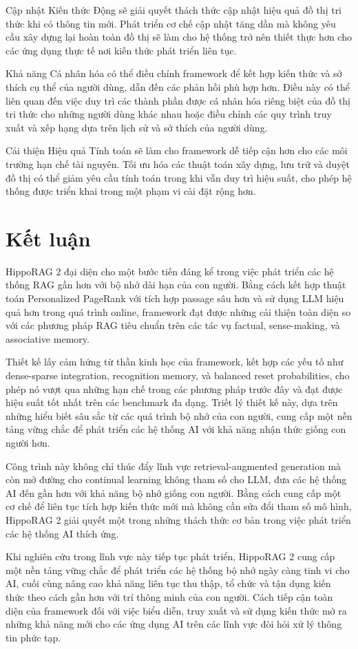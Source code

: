 \documentclass[../main.tex]{subfiles}
\begin{document}
Cập nhật Kiến thức Động sẽ giải quyết thách thức cập nhật hiệu quả đồ thị tri thức khi có thông tin mới. Phát triển cơ chế cập nhật tăng dần mà không yêu cầu xây dựng lại hoàn toàn đồ thị sẽ làm cho hệ thống trở nên thiết thực hơn cho các ứng dụng thực tế nơi kiến thức phát triển liên tục.

Khả năng Cá nhân hóa có thể điều chỉnh framework để kết hợp kiến thức và sở thích cụ thể của người dùng, dẫn đến các phản hồi phù hợp hơn. Điều này có thể liên quan đến việc duy trì các thành phần được cá nhân hóa riêng biệt của đồ thị tri thức cho những người dùng khác nhau hoặc điều chỉnh các quy trình truy xuất và xếp hạng dựa trên lịch sử và sở thích của người dùng.

Cải thiện Hiệu quả Tính toán sẽ làm cho framework dễ tiếp cận hơn cho các môi trường hạn chế tài nguyên. Tối ưu hóa các thuật toán xây dựng, lưu trữ và duyệt đồ thị có thể giảm yêu cầu tính toán trong khi vẫn duy trì hiệu suất, cho phép hệ thống được triển khai trong một phạm vi cài đặt rộng hơn.

\section{Kết luận}
HippoRAG 2 đại diện cho một bước tiến đáng kể trong việc phát triển các hệ thống RAG gần hơn với bộ nhớ dài hạn của con người. Bằng cách kết hợp thuật toán Personalized PageRank với tích hợp passage sâu hơn và sử dụng LLM hiệu quả hơn trong quá trình online, framework đạt được những cải thiện toàn diện so với các phương pháp RAG tiêu chuẩn trên các tác vụ factual, sense-making, và associative memory.

Thiết kế lấy cảm hứng từ thần kinh học của framework, kết hợp các yếu tố như dense-sparse integration, recognition memory, và balanced reset probabilities, cho phép nó vượt qua những hạn chế trong các phương pháp trước đây và đạt được hiệu suất tốt nhất trên các benchmark đa dạng. Triết lý thiết kế này, dựa trên những hiểu biết sâu sắc từ các quá trình bộ nhớ của con người, cung cấp một nền tảng vững chắc để phát triển các hệ thống AI với khả năng nhận thức giống con người hơn.

Công trình này không chỉ thúc đẩy lĩnh vực retrieval-augmented generation mà còn mở đường cho continual learning không tham số cho LLM, đưa các hệ thống AI đến gần hơn với khả năng bộ nhớ giống con người. Bằng cách cung cấp một cơ chế để liên tục tích hợp kiến thức mới mà không cần sửa đổi tham số mô hình, HippoRAG 2 giải quyết một trong những thách thức cơ bản trong việc phát triển các hệ thống AI thích ứng.

Khi nghiên cứu trong lĩnh vực này tiếp tục phát triển, HippoRAG 2 cung cấp một nền tảng vững chắc để phát triển các hệ thống bộ nhớ ngày càng tinh vi cho AI, cuối cùng nâng cao khả năng liên tục thu thập, tổ chức và tận dụng kiến thức theo cách gần hơn với trí thông minh của con người. Cách tiếp cận toàn diện của framework đối với việc biểu diễn, truy xuất và sử dụng kiến thức mở ra những khả năng mới cho các ứng dụng AI trên các lĩnh vực đòi hỏi xử lý thông tin phức tạp.
\end{document}
